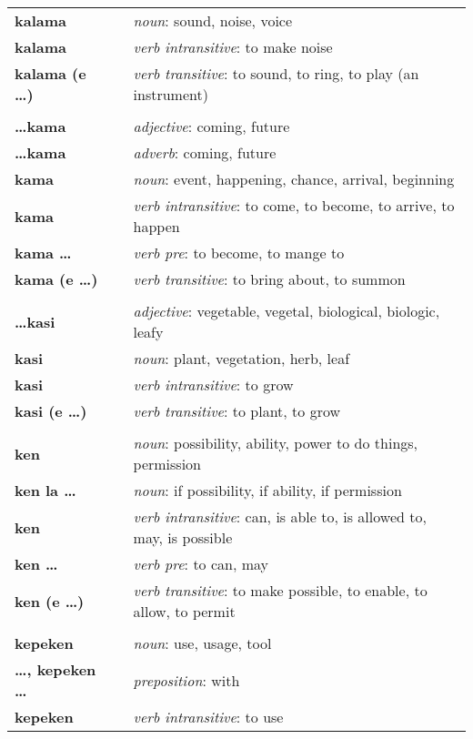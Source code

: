 \begin{supertabular}{p{2,5cm}|ll}
\textbf{kalama} && \textit{noun}: sound, noise, voice \\ 
\textbf{kalama} && \textit{verb intransitive}: to make noise \\ 
\textbf{kalama (e \dots)} && \textit{verb transitive}: to sound, to ring, to play (an instrument) \\ 
 && \\ %
\textbf{\dots kama} && \textit{adjective}: coming, future \\ 
\textbf{\dots kama} && \textit{adverb}: coming, future \\ 
\textbf{kama} && \textit{noun}: event, happening, chance, arrival, beginning \\ 
\textbf{kama} && \textit{verb intransitive}: to come, to become, to arrive, to happen \\ 
\textbf{kama \dots} && \textit{verb pre}: to become, to mange to \\ 
\textbf{kama (e \dots)} && \textit{verb transitive}: to bring about, to summon \\ 
 && \\ %
\textbf{\dots kasi} && \textit{adjective}: vegetable, vegetal, biological, biologic, leafy \\ 
\textbf{kasi} && \textit{noun}: plant, vegetation, herb, leaf \\ 
\textbf{kasi} && \textit{verb intransitive}: to grow \\ 
\textbf{kasi (e \dots)} && \textit{verb transitive}: to plant, to grow \\ 
 && \\ %
\textbf{ken} && \textit{noun}: possibility, ability, power to do things, permission \\ 
\textbf{ken la \dots} && \textit{noun}: if possibility, if ability, if permission \\ 
\textbf{ken} && \textit{verb intransitive}: can, is able to, is allowed to, may, is possible \\ 
\textbf{ken \dots} && \textit{verb pre}: to can, may \\ 
\textbf{ken (e \dots)} && \textit{verb transitive}: to make possible, to enable, to allow, to permit \\ 
 && \\ %
\textbf{kepeken} && \textit{noun}: use, usage, tool \\ 
\textbf{\dots , kepeken \dots} && \textit{preposition}: with \\ 
\textbf{kepeken} && \textit{verb intransitive}: to use \\ 

\end{supertabular}
